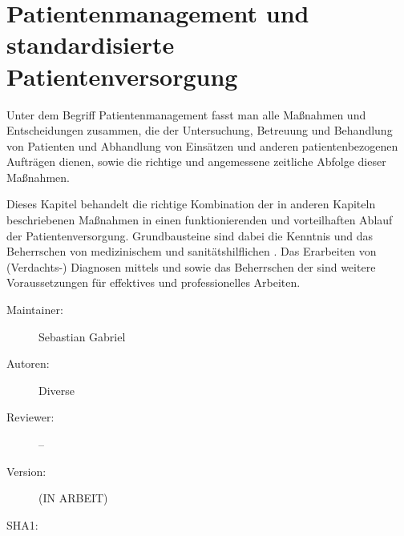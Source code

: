 \documentclass[
ngerman,
paper=a4,
asymmetric,
fontsize=10pt,
headings=small,
draft=false,
numbers=noenddot,
bibtotocnumbered,
footnotes=multiple,
]{scrreprt}
\newcommand{\DocVersionInfo}{IN ARBEIT}
\begin{document}
    \chapter
[\CO{[PAM]} Patientenmanagement und standardisierte Patientenversorgung]
{\CC{[PAM]} Patientenmanagement und standardisierte Patientenversorgung}
\label{chp:PAM}

\ChapterIntro
{%
Unter dem Begriff Patientenmanagement fasst man alle
Maßnahmen und Entscheidungen zusammen, die der Untersuchung,
Betreuung und Behandlung von Patienten und Abhandlung von
Einsätzen und anderen patientenbezogenen Aufträgen dienen,
sowie die richtige und angemessene zeitliche Abfolge dieser
Maßnahmen.

Dieses Kapitel behandelt die richtige Kombination der in
anderen Kapiteln beschriebenen Maßnahmen in einen
funktionierenden und vorteilhaften Ablauf der
Patientenversorgung. Grundbausteine sind dabei die Kenntnis
und das Beherrschen von medizinischem  und
sanitätshilflichen . Das Erarbeiten von
(Verdachts-) Diagnosen mittels  und
 sowie das Beherrschen der
 sind weitere
Voraussetzungen für effektives und professionelles Arbeiten.
}
{%
\begin{description}
  \item[Maintainer:] Sebastian Gabriel
  \item[Autoren:] Diverse
  \item[Reviewer:] --
  \item[Version:] {\DocVersion} ({\DocVersionInfo})
  \item[SHA1:] {\DocGitCommit}
\end{description}

{\TxTeilkapitelAASS}}



% 
% 

\clearpage %
% 
\end{document}
